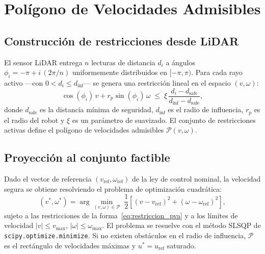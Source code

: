 \section{Polígono de Velocidades Admisibles}

\subsection{Construcción de restricciones desde LiDAR}

El sensor LiDAR entrega $n$ lecturas de distancia $d_i$ a ángulos $\phi_i = -\pi + i\,(2\pi/n)$ uniformemente distribuidos en $[-\pi, \pi)$. Para cada rayo activo —con $0 < d_i \leq d_{\text{inf}}$— se genera una restricción lineal en el espacio $(v, \omega)$:
\begin{equation}
  \cos(\phi_i)\, v + r_p \sin(\phi_i)\, \omega \;\leq\; \xi\,\frac{d_i - d_{\text{safe}}}{d_{\text{inf}} - d_{\text{safe}}},
  \label{eq:restriccion_pva}
\end{equation}
donde $d_{\text{safe}}$ es la distancia mínima de seguridad, $d_{\text{inf}}$ es el radio de influencia, $r_p$ es el radio del robot y $\xi$ es un parámetro de suavizado. El conjunto de restricciones activas define el polígono de velocidades admisibles $\mathcal{P}(v,\omega)$.

\subsection{Proyección al conjunto factible}

Dado el vector de referencia $(v_{\text{ref}}, \omega_{\text{ref}})$ de la ley de control nominal, la velocidad segura se obtiene resolviendo el problema de optimización cuadrática:
\begin{equation}
  (v^*, \omega^*) = \arg\min_{(v,\omega)\in\mathcal{P}}\;
  \frac{1}{2}\!\left[(v - v_{\text{ref}})^2 + (\omega - \omega_{\text{ref}})^2\right],
  \label{eq:qp}
\end{equation}
sujeto a las restricciones de la forma~\eqref{eq:restriccion_pva} y a los límites de velocidad $|v| \leq v_{\max}$, $|\omega| \leq \omega_{\max}$. El problema se resuelve con el método SLSQP de \texttt{scipy.optimize.minimize}. Si no existen obstáculos en el radio de influencia, $\mathcal{P}$ es el rectángulo de velocidades máximas y $u^* = u_{\text{ref}}$ saturado.
